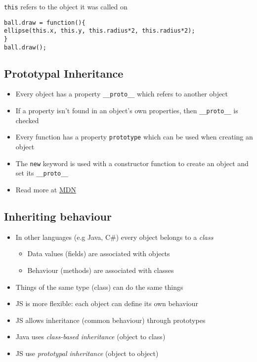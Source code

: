 \documentclass{article}[18pt]
\providecommand{\tightlist}{%
	\setlength{\itemsep}{0pt}\setlength{\parskip}{0pt}}
\begin{document}
\texttt{this} refers to the object it was called on

\begin{verbatim}
ball.draw = function(){
ellipse(this.x, this.y, this.radius*2, this.radius*2);
}
ball.draw();
\end{verbatim}

\hypertarget{prototypal-inheritance}{%
	\subsection{Prototypal Inheritance}\label{prototypal-inheritance}}

\begin{itemize}
	\tightlist
	\item
	Every object has a property \texttt{\_\_proto\_\_} which refers to
	another object
	\item
	If a property isn't found in an object's own properties, then
	\texttt{\_\_proto\_\_} is checked
	\item
	Every function has a property \texttt{prototype} which can be used
	when creating an object
	\item
	The \texttt{new} keyword is used with a constructor function to create
	an object and set its \texttt{\_\_proto\_\_}
	\item
	Read more at
	\href{https://developer.mozilla.org/en-US/docs/Web/JavaScript/Inheritance_and_the_prototype_chain}{MDN}
\end{itemize}

\hypertarget{inheriting-behaviour}{%
	\subsection{Inheriting behaviour}\label{inheriting-behaviour}}

\begin{itemize}
	\item
	In other languages (e.g Java, C\#) every object belongs to a
	\emph{class}
	
	\begin{itemize}
		\tightlist
		\item
		Data values (fields) are associated with objects
		\item
		Behaviour (methods) are associated with classes
	\end{itemize}
	\item
	Things of the same type (class) can do the same things
	\item
	JS is more flexible: each object can define its own behaviour
	\item
	JS allows inheritance (common behaviour) through prototypes
	\item
	Java uses \emph{class-based inheritance} (object to class)
	\item
	JS use \emph{prototypal inheritance} (object to object)
\end{itemize}
\end{document}

